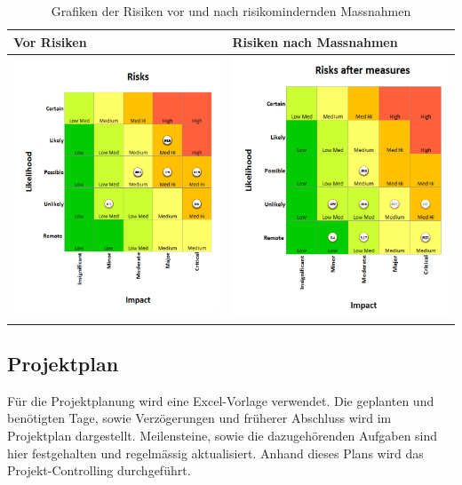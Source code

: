 \documentclass[../main.tex]{subfiles}
\begin{document}
\newpage
\begin{table}[H]
\centering
\begin{tabular}{|l|l|}
\hline
\textbf{Vor Risiken} & \textbf{Risiken nach Massnahmen} \\ \hline
 \includegraphics[width=8cm]{img/Risikomatrix/Risks_before_measures_v_pren1.png}        & \includegraphics[width=8cm]{img/Risikomatrix/Risks_after_measures_v_pren1.png} \\ \hline
 
\end{tabular}
\caption{Grafiken der Risiken vor und nach risikomindernden Massnahmen}
\label{tab:risikografik}
\end{table}


\subsection{Projektplan}
Für die Projektplanung wird eine Excel-Vorlage verwendet. Die geplanten und benötigten Tage, sowie Verzögerungen und früherer Abschluss wird im Projektplan dargestellt. Meilensteine, sowie die dazugehörenden Aufgaben sind hier festgehalten und regelmässig aktualisiert. Anhand dieses Plans wird das Projekt-Controlling durchgeführt.

\end{document}
